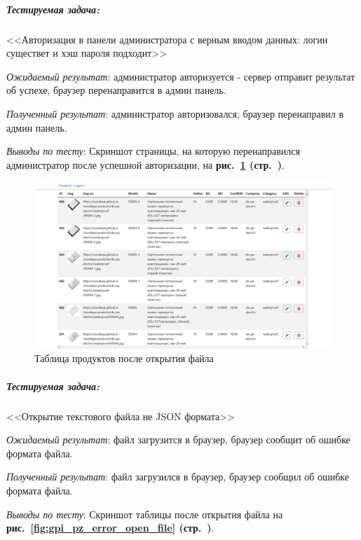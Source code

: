 
\subparagraph{Тестируемая задача:} <<Авторизация в панели администратора с верным вводом данных: логин существет и хэш пароля подходит>>

\textit{Ожидаемый результат}: администратор авторизуется - сервер отправит результат об успехе,
браузер перенаправится в админ панель.

\textit{Полученный результат}: администратор авторизовался, браузер перенаправил в админ панель.

\textit{Выводы по тесту}:
Скриншот страницы, на которую перенаправился администратор после успешной авторизации, на
\textbf{рис.~\ref{fig:gpi_pz_adminpanel} (стр.~\pageref{fig:gpi_pz_adminpanel})}.

\begin{figure}[!htb]
    \centering
    \includegraphics[width=12cm]
        {_assets/gpi_pz_not_empty_table.png}
    \caption{Таблица продуктов после открытия файла}
    \label{fig:gpi_pz_adminpanel}
\end{figure}


\subparagraph{Тестируемая задача:} <<Открытие текстового файла не JSON формата>>

\textit{Ожидаемый результат}: файл загрузится в браузер, браузер сообщит об ошибке формата файла.

\textit{Полученный результат}: файл загрузился в браузер, браузер сообщил об ошибке формата файла.

\textit{Выводы по тесту}:
Скриншот таблицы после открытия файла на
\textbf{рис.~\ref{fig:gpi_pz_error_open_file} (стр.~\pageref{fig:gpi_pz_error_open_file})}.

